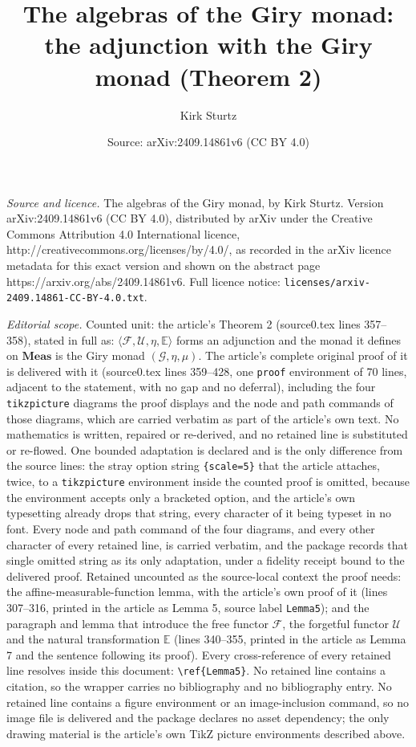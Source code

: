 \documentclass[10pt,a4paper]{amsart}
\title[Theorem 2]{The algebras of the Giry monad: the adjunction with the Giry monad (Theorem 2)}
\author{Kirk Sturtz}
\date{Source: arXiv:2409.14861v6 (CC BY 4.0)}
\newcommand{\G}{\mathcal{G}}
\begin{document}
\maketitle

\noindent\emph{Source and licence.} The algebras of the Giry monad, by Kirk Sturtz. Version arXiv:2409.14861v6
(CC BY 4.0), distributed by arXiv under the Creative Commons Attribution 4.0 International licence,
http://creativecommons.org/licenses/by/4.0/, as recorded in the arXiv licence metadata for this exact
version and shown on the abstract page https://arxiv.org/abs/2409.14861v6. Full licence notice:
\texttt{licenses/arxiv-2409.14861-CC-BY-4.0.txt}.\par\smallskip

\noindent\textit{Editorial scope.} Counted unit: the article's Theorem 2 (source0.tex lines 357--358), stated in full as: $\langle \mathcal{F}, \mathcal{U}, \eta, \mathbb{E} \rangle$ forms an adjunction and the monad it defines on $\mathbf{Meas}$ is the Giry monad $(\G, \eta, \mu)$. The article's complete original proof of it is delivered with it (source0.tex lines 359--428, one \texttt{proof} environment of 70 lines, adjacent to the statement, with no gap and no deferral), including the four \texttt{tikzpicture} diagrams the proof displays and the node and path commands of those diagrams, which are carried verbatim as part of the article's own text. No mathematics is written, repaired or re-derived, and no retained line is substituted or re-flowed. One bounded adaptation is declared and is the only difference from the source lines: the stray option string \texttt{\{scale=5\}} that the article attaches, twice, to a \texttt{tikzpicture} environment inside the counted proof is omitted, because the environment accepts only a bracketed option, and the article's own typesetting already drops that string, every character of it being typeset in no font. Every node and path command of the four diagrams, and every other character of every retained line, is carried verbatim, and the package records that single omitted string as its only adaptation, under a fidelity receipt bound to the delivered proof. Retained uncounted as the source-local context the proof needs: the affine-measurable-function lemma, with the article's own proof of it (lines 307--316, printed in the article as Lemma 5, source label \texttt{Lemma5}); and the paragraph and lemma that introduce the free functor $\mathcal{F}$, the forgetful functor $\mathcal{U}$ and the natural transformation $\mathbb{E}$ (lines 340--355, printed in the article as Lemma 7 and the sentence following its proof). Every cross-reference of every retained line resolves inside this document: \texttt{\textbackslash ref\{Lemma5\}}. No retained line contains a citation, so the wrapper carries no bibliography and no bibliography entry. No retained line contains a figure environment or an image-inclusion command, so no image file is delivered and the package declares no asset dependency; the only drawing material is the article's own TikZ picture environments described above.
\end{document}

